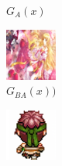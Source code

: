 \documentclass{beamer}
\begin{document}
\begin{frame}
\begin{figure}[htb]
\begin{subfigure}[b]{0.23\linewidth}
        \caption{$G_A(x)$}
      \end{subfigure}
      \begin{subfigure}[b]{0.23\linewidth}
        \includegraphics[width=\linewidth]{exp5_epoch140_rec_A.png}
        \caption{$G_{BA}(x))$}
      \end{subfigure}
      \begin{subfigure}[b]{0.23\linewidth}
        \includegraphics[width=\linewidth]{exp5_epoch140_idt_A.png}

\end{subfigure}
\end{figure}
\end{frame}
\end{document}
